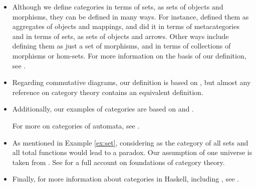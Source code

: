 \begin{itemize}
\item

  Although we define categories in terms of sets, as sets of objects
  and morphisms, they can be defined in many ways. For instance,
  \textcite{eilenberg-maclane-1945} defined them as aggregates of
  objects and mappings, and \textcite{maclane-1998} did it in terms of
  metacategories and in terms of sets, as sets of objects and arrows.
  Other ways include defining them as just a set of morphisms, and in
  terms of collections of morphisms or hom-sets. For more information
  on the basis of our definition, see
  \parencites[7--8,~10]{maclane-1998}[418]{poigne-1992}.

\item

  Regarding commutative diagrams, our definition is based on
  \parencites[8]{maclane-1998}[434--435]{poigne-1992}, but almost any
  reference on category theory contains an equivalent definition.

\item

  Additionally, our examples of categories are based on
  \parencites[8--9,~10--12]{maclane-1998}[§~1.2.2]{poigne-1992} and
  \parencites{pierce-1991}{bird-demoor-1997}{marquis-2013}.

  For more on categories of automata, see
  \parencite[421]{poigne-1992}.


\item

  As mentioned in Example \ref{ex:set}, considering \set as the
  category of all sets and all total functions would lead to a
  paradox. Our assumption of one universe is taken from
  \parencite[12]{maclane-1998}. See \parencite[§~I.6]{maclane-1998}
  for a full account on foundations of category theory.

\item

  Finally, for more information about categories in Haskell, including
  \hask, see \parencites[74]{elkins-2009}[49--51]{yorgey-2009}.

\end{itemize}

\clearemptydoublepage
